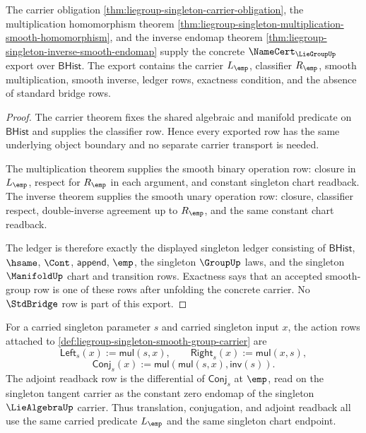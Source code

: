 \begin{theorem}
\label{thm:liegroup-singleton-smooth-group-namecert-export}
The carrier obligation
\autoref{thm:liegroup-singleton-carrier-obligation}, the multiplication
homomorphism theorem
\autoref{thm:liegroup-singleton-multiplication-smooth-homomorphism}, and the
inverse endomap theorem
\autoref{thm:liegroup-singleton-inverse-smooth-endomap} supply the concrete
$\NameCert_{\LieGroupUp}$ export over $\mathsf{BHist}$. The export contains the
carrier $L_{\emp}$, classifier $R_{\emp}$, smooth multiplication, smooth
inverse, ledger rows, exactness condition, and the absence of standard bridge
rows.
\end{theorem}
\begin{proof}
The carrier theorem fixes the shared algebraic and manifold predicate on
$\mathsf{BHist}$ and supplies the classifier row. Hence every exported row has
the same underlying object boundary and no separate carrier transport is
needed.

The multiplication theorem supplies the smooth binary operation row: closure in
$L_{\emp}$, respect for $R_{\emp}$ in each argument, and constant singleton
chart readback. The inverse theorem supplies the smooth unary operation row:
closure, classifier respect, double-inverse agreement up to $R_{\emp}$, and the
same constant chart readback.

The ledger is therefore exactly the displayed singleton ledger consisting of
$\mathsf{BHist}$, $\hsame$, $\Cont$, $\mathsf{append}$, $\emp$, the singleton
$\GroupUp$ laws, and the singleton $\ManifoldUp$ chart and transition rows.
Exactness says that an accepted smooth-group row is one of these rows after
unfolding the concrete carrier. No $\StdBridge$ row is part of this export.
\end{proof}

\begin{definition}
\label{def:liegroup-singleton-translation-and-conjugation-rows}
For a carried singleton parameter $s$ and carried singleton input $x$, the
action rows attached to
\autoref{def:liegroup-singleton-smooth-group-carrier} are
$$
\mathsf{Left}_s(x):=\mathsf{mul}(s,x),\qquad
\mathsf{Right}_s(x):=\mathsf{mul}(x,s),
$$
$$
\mathsf{Conj}_s(x):=\mathsf{mul}(\mathsf{mul}(s,x),\mathsf{inv}(s)).
$$
The adjoint readback row is the differential of $\mathsf{Conj}_s$ at $\emp$,
read on the singleton tangent carrier as the constant zero endomap of the
singleton $\LieAlgebraUp$ carrier. Thus translation, conjugation, and adjoint
readback all use the same carried predicate $L_{\emp}$ and the same singleton
chart endpoint.
\end{definition}

